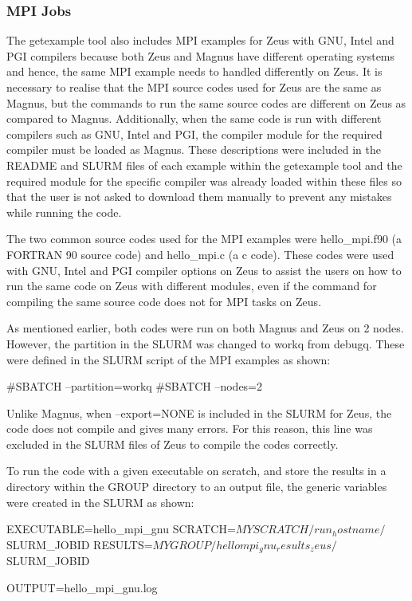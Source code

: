 \documentclass[journal]{IEEEtran}
\begin{document}
\subsubsection{MPI Jobs}

The getexample tool also includes MPI examples for Zeus with GNU, Intel and PGI compilers because both Zeus and Magnus have different operating systems 
and hence, the same MPI example needs to handled differently on Zeus. It is necessary to realise that the MPI source codes used for Zeus are the same
as Magnus, but the commands to run the same source codes are different on Zeus as compared to Magnus. Additionally, when the same code is run 
with different compilers such as GNU, Intel and PGI, the compiler module for the required compiler must be loaded as Magnus. These descriptions were
included in the README and SLURM files of each example within the getexample tool and the required module for the specific compiler was already loaded 
within these files so that the user is not asked to download them manually to prevent any mistakes while running the code.

The two common source codes used for the MPI examples were hello_mpi.f90 (a FORTRAN 90 source code) and hello_mpi.c (a c code). These codes were used 
with GNU, Intel and PGI compiler options on Zeus to assist the users on how to run the same code on Zeus with different modules, even if the command 
for compiling the same source code does not for MPI tasks on Zeus.

As mentioned earlier, both codes were run on both Magnus and Zeus on 2 nodes. However, the partition in the SLURM was changed to workq from debugq.
These were defined in the SLURM script of the MPI examples as shown: 

#SBATCH --partition=workq
#SBATCH --nodes=2

Unlike Magnus, when --export=NONE is included in the SLURM for Zeus, the code does not compile and gives many errors. For this reason, this line was
excluded in the SLURM files of Zeus to compile the codes correctly.

To run the code with a given executable on scratch, and store the results in a directory within the GROUP directory to an output file, the generic 
variables were created in the SLURM as shown:

EXECUTABLE=hello_mpi_gnu
SCRATCH=$MYSCRATCH/run_hostname/$SLURM_JOBID
RESULTS=$MYGROUP/hellompi_gnu_results_zeus/$SLURM_JOBID

OUTPUT=hello_mpi_gnu.log
\end{document}
